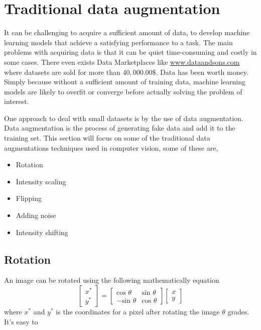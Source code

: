 \documentclass[11pt]{article}
\begin{document}
\section{Traditional data augmentation}\label{sec:data_augmentation}

It can be challenging to acquire a sufficient amount of data, to develop machine learning models that achieve a satisfying performance to a task. The main problems with acquiring data is that it can be quiet time-consuming and costly in some cases. There even exists Data Marketplaces like \url{www.dataandsons.com} where datasets are sold for more than $40,000.00\$$. Data has been worth money. Simply because without a sufficient amount of training data, machine learning models are likely to overfit or converge before actually solving the problem of interest. 

One approach to deal with small datasets is by the use of data augmentation. Data augmentation is the process of generating fake data and add it to the training set. This section will focus on some of the traditional data augmentations techniques used in computer vision, some of these are,
\begin{itemize}
    \item Rotation
    \item Intensity scaling
    \item Flipping
    \item Adding noise
    \item Intensity shifting
\end{itemize}


\subsection{Rotation}
An image can be rotated using the following mathematically equation
\begin{equation}
    \begin{bmatrix} 
    x^{\ast} \\
    y^{\ast} 
    \end{bmatrix} = 
    \begin{bmatrix} 
    \text{cos } \theta & \text{sin } \theta \\
    -\text{sin } \theta & \text{cos } \theta
    \end{bmatrix}
        \begin{bmatrix} 
    x \\
    y 
    \end{bmatrix}
\end{equation}
where $x^{\ast}$ and $y^{\ast}$ is the coordinates for a pixel after rotating the image $\theta$ grades. It's easy to 
\end{document}
